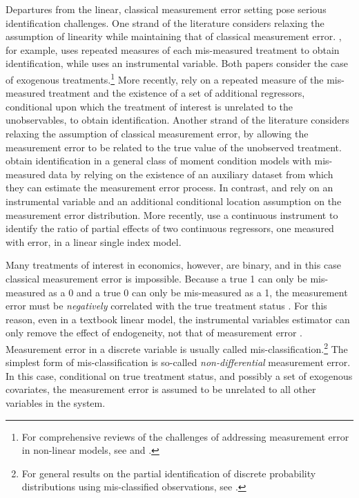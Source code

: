 Departures from the linear, classical measurement error setting pose serious identification challenges.
One strand of the literature considers relaxing the assumption of linearity while maintaining that of classical measurement error.
\cite{schennach2004}, for example, uses repeated measures of each mis-measured treatment to obtain identification, while \cite{schennach2007} uses an instrumental variable.  
Both papers consider the case of exogenous treatments.\footnote{For comprehensive reviews of the challenges of addressing measurement error in non-linear models, see  \cite{chensurvey} and \cite{SchennachSurvey}.}
More recently, \cite{SongSchennachWhite} rely on a repeated measure of the mis-measured treatment and the existence of a set of additional regressors, conditional upon which the treatment of interest is unrelated to the unobservables, to obtain identification.      
Another strand of the literature considers relaxing the assumption of classical measurement error, by allowing the measurement error to be related to the true value of the unobserved treatment.
\cite{ChenHongTamer} obtain identification in a general class of moment condition models with mis-measured data by relying on the existence of an auxiliary dataset from which they can estimate the measurement error process.
In contrast, \cite{HuSchennach} and \cite{song2015} rely on an instrumental variable and an additional conditional location assumption on the measurement error distribution. 
More recently, \cite{HuShiuWoutersen} use a continuous instrument to identify the ratio of partial effects of two continuous regressors, one measured with error, in a linear single index model.

Many treatments of interest in economics, however, are binary, and in this case classical measurement error is impossible.
Because a true 1 can only be mis-measured as a 0 and a true 0 can only be mis-measured as a 1, the measurement error must be \emph{negatively} correlated with the true treatment status \citep{Aigner,Bollinger}. 
For this reason, even in a textbook linear model, the instrumental variables estimator can only remove the effect of endogeneity, not that of measurement error \citep{FL}. 
Measurement error in a discrete variable is usually called mis-classification.\footnote{For general results on the partial identification of discrete probability distributions using mis-classified observations, see \cite{molinari}.}
The simplest form of mis-classification is so-called \emph{non-differential} measurement error.
In this case, conditional on true treatment status, and possibly a set of exogenous covariates, the measurement error is assumed to be unrelated to all other variables in the system.

